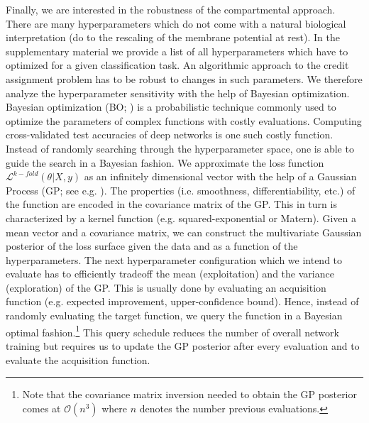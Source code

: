 \documentclass[colorinlistoftodos]{article}
\theoremstyle{definition}
\begin{document}
Finally, we are interested in the robustness of the compartmental approach. There are many hyperparameters which do not come with a natural biological interpretation (do to the rescaling of the membrane potential at rest). In the supplementary material we provide a list of all hyperparameters which have to optimized for a given classification task. An algorithmic approach to the credit assignment problem has to be robust to changes in such parameters. We therefore analyze the hyperparameter sensitivity with the help of Bayesian optimization.
Bayesian optimization (BO; \citet{snoek_2012}) is a probabilistic technique commonly used to optimize the parameters of complex functions with costly evaluations. Computing cross-validated test accuracies of deep networks is one such costly function. Instead of randomly searching through the hyperparameter space, one is able to guide the search in a Bayesian fashion. We approximate the loss function $\mathcal{L}^{k-fold}(\theta|X, y)$ as an infinitely dimensional vector with the help of a Gaussian Process (GP; see e.g. \citet{rasmussen_2004}). The properties (i.e. smoothness, differentiability, etc.) of the function are encoded in the covariance matrix of the GP. This in turn is characterized by a kernel function (e.g. squared-exponential or Matern). Given a mean vector and a covariance matrix, we can construct the multivariate Gaussian posterior of the loss surface given the data and as a function of the hyperparameters. 
The next hyperparameter configuration which we intend to evaluate has to efficiently tradeoff the mean (exploitation) and the variance (exploration) of the GP. This is usually done by evaluating an acquisition function (e.g. expected improvement, upper-confidence bound). Hence, instead of randomly evaluating the target function, we query the function in a Bayesian optimal fashion.\footnote{Note that the covariance matrix inversion needed to obtain the GP posterior comes at $\mathcal{O}(n^3)$ where $n$ denotes the number previous evaluations.} This query schedule reduces the number of overall network training but requires us to update the GP posterior after every evaluation and to evaluate the acquisition function.
\end{document}
